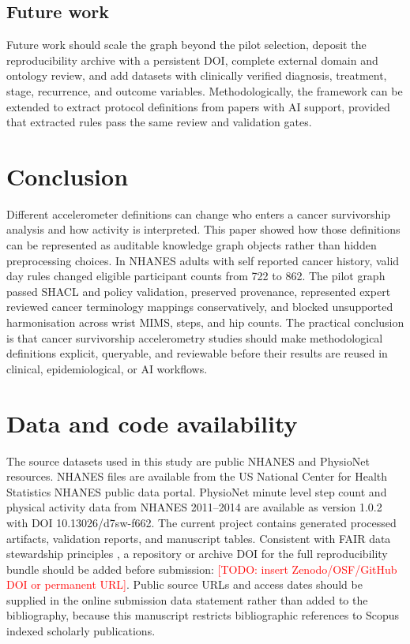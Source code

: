 \documentclass[final,5p,times,twocolumn]{elsarticle}
\newcommand{\todo}[1]{\textcolor{red}{[TODO: #1]}}
\begin{document}
\subsection{Future work}

Future work should scale the graph beyond the pilot selection, deposit the reproducibility archive with a persistent DOI, complete external domain and ontology review, and add datasets with clinically verified diagnosis, treatment, stage, recurrence, and outcome variables. Methodologically, the framework can be extended to extract protocol definitions from papers with AI support, provided that extracted rules pass the same review and validation gates.

\section{Conclusion}
\label{sec:conclusion}

Different accelerometer definitions can change who enters a cancer survivorship analysis and how activity is interpreted. This paper showed how those definitions can be represented as auditable knowledge graph objects rather than hidden preprocessing choices. In NHANES adults with self reported cancer history, valid day rules changed eligible participant counts from 722 to 862. The pilot graph passed SHACL and policy validation, preserved provenance, represented expert reviewed cancer terminology mappings conservatively, and blocked unsupported harmonisation across wrist MIMS, steps, and hip counts. The practical conclusion is that cancer survivorship accelerometry studies should make methodological definitions explicit, queryable, and reviewable before their results are reused in clinical, epidemiological, or AI workflows.

\section*{Data and code availability}

The source datasets used in this study are public NHANES and PhysioNet resources. NHANES files are available from the US National Center for Health Statistics NHANES public data portal. PhysioNet minute level step count and physical activity data from NHANES 2011--2014 are available as version 1.0.2 with DOI 10.13026/d7sw-f662. The current project contains generated processed artifacts, validation reports, and manuscript tables. Consistent with FAIR data stewardship principles \cite{wilkinson2016fair}, a repository or archive DOI for the full reproducibility bundle should be added before submission: \todo{insert Zenodo/OSF/GitHub DOI or permanent URL}. Public source URLs and access dates should be supplied in the online submission data statement rather than added to the bibliography, because this manuscript restricts bibliographic references to Scopus indexed scholarly publications.
\end{document}
